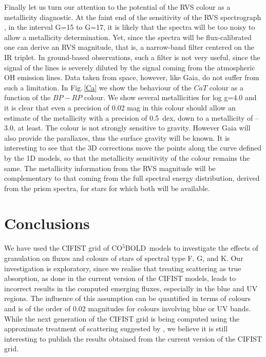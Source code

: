 \documentclass[]{aa}
\newcommand{\cobold}{{\sf CO$^5$BOLD}}
\begin{document}
Finally let us turn our attention to the potential of the RVS colour as a metallicity diagnostic. 
At the faint end of the sensitivity of the RVS spectrograph \citep{RVS},
in the interval G=15 to G=17, it is likely that the spectra will
be too noisy to allow a metallicity determination. Yet, since the spectra
will be flux-calibrated one can derive an RVS magnitude, that is, a narrow-band filter centered on the IR  triplet. In ground-based
observations, such a filter is not very useful, since the signal of
the  lines is severely diluted by the signal coming from the
atmospheric OH emission lines. Data taken from space, however, like Gaia, do
not suffer from such a limitation.
In Fig.\,\ref{Ca} we show the behaviour of the $CaT$ colour
as a function of the $BP-RP$ colour. 
We show several metallicities for log g=4.0 and it is  clear that even
a precision of 0.02 mag in this colour should allow an estimate
of the metallicity with a precision of 0.5\, dex, down to a metallicity of --3.0, 
at least. The colour is not strongly sensitive to gravity. However
Gaia will also provide the parallaxes, thus the surface gravity will be
known. It is interesting to see that the 3D corrections move the
points along the curve defined by the 1D models, so that the
metallicity sensitivity of the colour remains the same.
The metallicity information from the RVS magnitude will be
complementary to that coming from the full spectral energy distribution,
derived from the prism spectra, for stars for which both will be available.



\section{Conclusions}


We have used the CIFIST grid of \cobold\
models to investigate the effects of granulation
on fluxes and colours of stars of spectral type F, G, and K.
Our investigation is exploratory, since we realise that treating
scattering as true absorption, as done in the current
version of the CIFIST models, leads to incorrect results in the
computed emerging fluxes, especially in the blue and UV regions.  
The influence of this assumption can be quantified in terms of
colours and is of the order of 0.02 magnitudes for colours
involving blue or UV bands. 
While the next generation of the CIFIST grid is being computed
using the approximate treatment of scattering suggested
by \citet{Hayek}, we believe it is still interesting to 
publish the results obtained from the current version
of the CIFIST grid.
\end{document}
